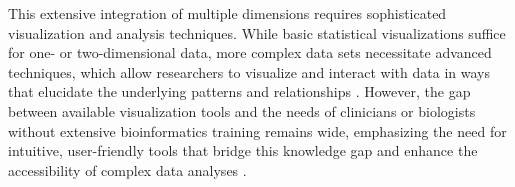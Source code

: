 This extensive integration of multiple dimensions requires sophisticated
visualization and analysis techniques. While basic statistical visualizations
suffice for one- or two-dimensional data, more complex data sets necessitate
advanced techniques, which allow researchers to visualize and interact with data
in ways that elucidate the underlying patterns and relationships
\cite{dunnExploringVisualizingMultidimensional2017}. However, the gap between
available visualization tools and the needs of clinicians or biologists without
extensive bioinformatics training remains wide, emphasizing the need for
intuitive, user-friendly tools that bridge this knowledge gap and enhance the
accessibility of complex data analyses
\cite{dunnExploringVisualizingMultidimensional2017}.









